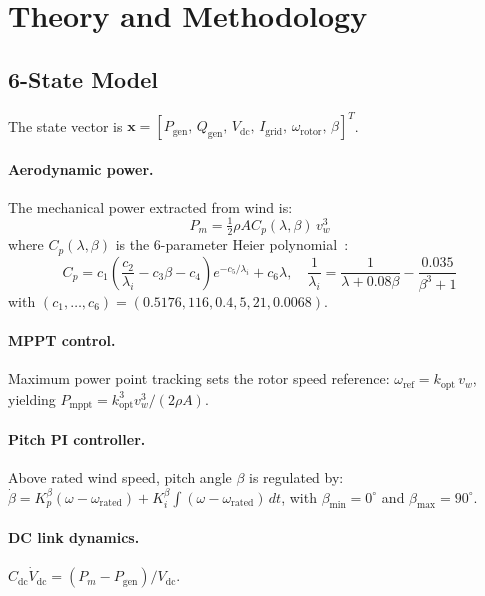 \documentclass[11pt, a4paper]{article}
\begin{document}
\section{Theory and Methodology}
\label{sec:theory}

\subsection{6-State Model}

The state vector is $\mathbf{x} = [P_{\mathrm{gen}},\, Q_{\mathrm{gen}},
\, V_{\mathrm{dc}},\, I_{\mathrm{grid}},\, \omega_{\mathrm{rotor}},\,
\beta]^T$.

\paragraph{Aerodynamic power.}
The mechanical power extracted from wind is:
\begin{equation}
  P_m = \tfrac{1}{2}\rho A C_p(\lambda, \beta)\, v_w^3
  \label{eq:pm}
\end{equation}
where $C_p(\lambda, \beta)$ is the 6-parameter Heier polynomial~\cite{Heier2014}:
\begin{equation}
  C_p = c_1\!\left(\frac{c_2}{\lambda_i} - c_3\beta - c_4\right)
    e^{-c_5/\lambda_i} + c_6\lambda,\quad
  \frac{1}{\lambda_i} = \frac{1}{\lambda + 0.08\beta}
    - \frac{0.035}{\beta^3 + 1}
  \label{eq:cp}
\end{equation}
with $(c_1,\ldots,c_6) = (0.5176, 116, 0.4, 5, 21, 0.0068)$.

\paragraph{MPPT control.}
Maximum power point tracking sets the rotor speed reference:
$\omega_{\mathrm{ref}} = k_{\mathrm{opt}}\,v_w$, yielding
$P_{\mathrm{mppt}} = k_{\mathrm{opt}}^3 v_w^3 / (2\rho A)$.

\paragraph{Pitch PI controller.}
Above rated wind speed, pitch angle $\beta$ is regulated by:
$\dot{\beta} = K_p^{\beta}(\omega - \omega_{\mathrm{rated}})
+ K_i^{\beta}\int(\omega - \omega_{\mathrm{rated}})\,dt$,
with $\beta_{\mathrm{min}} = 0^\circ$ and $\beta_{\mathrm{max}} = 90^\circ$.

\paragraph{DC link dynamics.}
$C_{\mathrm{dc}}\dot{V}_{\mathrm{dc}} = (P_m - P_{\mathrm{gen}}) / V_{\mathrm{dc}}$.
\end{document}
